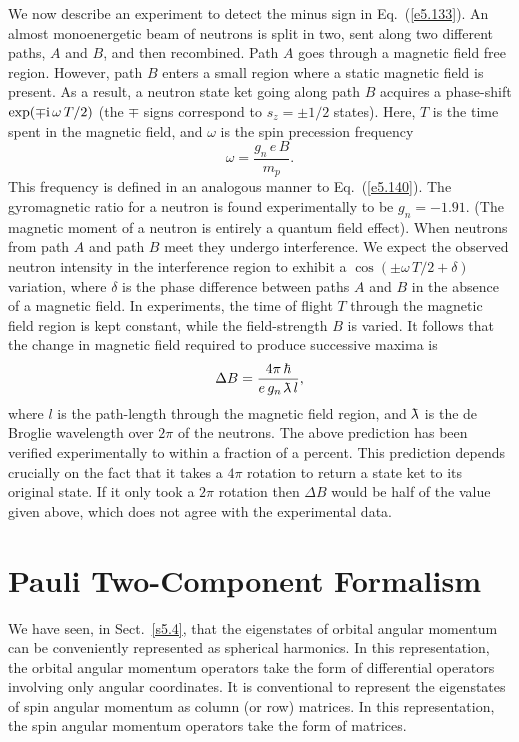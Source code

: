 We now describe an experiment to detect the minus sign in Eq.~(\ref{e5.133}). An almost
 monoenergetic beam of neutrons is split in two, sent along two different
paths, $A$ and $B$, and then recombined. Path $A$ goes through a magnetic field
free region. However, path $B$ enters a small  region where a static magnetic
field is present. As a result, a neutron state ket going along path
$B$ acquires a phase-shift $\exp(\mp{\rm i}\, \omega \,T/2)$ (the $\mp$
signs correspond to $s_z = \pm 1/2$ states). Here, $T$ is the
time spent in the magnetic field, and $\omega$ is the spin precession frequency
\begin{equation}
\omega = \frac{g_n\, e\,B}{m_p}.
\end{equation}
This frequency is defined in an analogous manner to Eq.~(\ref{e5.140}). The gyromagnetic
ratio for a neutron is found experimentally to be $g_n = -1.91$. 
(The magnetic moment of a neutron is entirely a quantum field effect).
When neutrons from path $A$ and path $B$ meet they undergo interference. We
expect the observed  neutron intensity in the interference region to
exhibit a $\cos( \pm \omega\, T/2 + \delta)$ variation, 
where $\delta$ is the phase difference 
between paths $A$ and $B$ in the absence of a magnetic field. In experiments,
the time of flight $T$ through the magnetic field region is kept constant, while
the field-strength $B$ is varied. It follows that the change in magnetic
field required to produce successive maxima is 
\begin{equation}
\Delta B = \frac{4\pi \,\hbar}{e\, g_n\, \lambdabar\, l},
\end{equation}
where $l$ is the path-length through the magnetic field region, and $\lambdabar$
is the de Broglie wavelength over $2\pi$ of the neutrons. The above prediction has been verified
experimentally to within a fraction of a percent. This prediction depends crucially
on the fact that it takes a $4\pi$ rotation to return a state ket to its
original state. If it only took a $2\pi$ rotation then $\Delta B$ would be half
of the value given above, which does not agree with the experimental data. 

\section{Pauli Two-Component Formalism}
We have seen, in Sect.~\ref{s5.4}, that the eigenstates of orbital angular momentum
can be conveniently represented as spherical harmonics. In this
representation, the orbital  angular momentum 
operators take the form of  differential operators involving only
angular coordinates. It is conventional to represent the eigenstates of spin
angular momentum as column (or row) matrices. In this representation,
the spin angular momentum operators take the form of matrices. 

